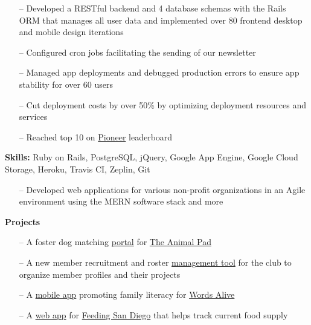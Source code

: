 
\medskip


\begin{itemize}
    \setlength{\itemindent}{0.5em}
    \item[--] Developed a RESTful backend and 4 database schemas with the Rails ORM that manages all user data and implemented over 80 frontend desktop and mobile design iterations
    \item[--] Configured cron jobs facilitating the sending of our newsletter
    \item[--] Managed app deployments and debugged production errors to ensure app stability for over 60 users
    \item[--] Cut deployment costs by over 50\% by optimizing deployment resources and services
    \item[--] Reached top 10 on \href{https://pioneer.app}{Pioneer} leaderboard
\end{itemize}

\smallskip

\textbf{Skills:} Ruby on Rails, PostgreSQL, jQuery, Google App Engine, Google Cloud Storage, Heroku, Travis CI, Zeplin, Git




\begin{itemize}
    \item[--] Developed web applications for various non-profit organizations in an Agile environment using the MERN software stack and more
\end{itemize}

\smallskip
\textbf{Projects}\\
\begin{itemize}
    \item[--] A foster dog matching \href{https://github.com/TritonSE/TAP-Foster-Dog-Matching}{portal} for \href{https://theanimalpad.org}{The Animal Pad}
    \item[--] A new member recruitment and roster \href{https://github.com/TritonSE/TSE-Oktavian}{management tool} for the club to organize member profiles and their projects
    \item[--] A \href{https://github.com/TritonSE/WA-Family-Literacy-Application}{mobile app} promoting family literacy for \href{https://www.wordsalive.org}{Words Alive}
    \item[--] A \href{https://github.com/TritonSE/FSD-Supply-Chain}{web app} for \href{https://feedingsandiego.org}{Feeding San Diego} that helps track current food supply
\end{itemize}

